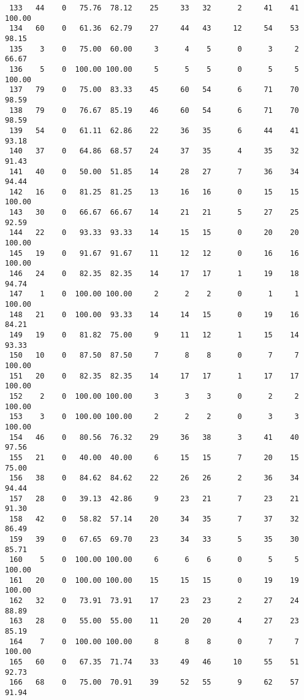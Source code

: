 \begin{verbatim}
 133   44    0   75.76  78.12    25     33   32      2     41    41   100.00
 134   60    0   61.36  62.79    27     44   43     12     54    53    98.15
 135    3    0   75.00  60.00     3      4    5      0      3     2    66.67
 136    5    0  100.00 100.00     5      5    5      0      5     5   100.00
 137   79    0   75.00  83.33    45     60   54      6     71    70    98.59
 138   79    0   76.67  85.19    46     60   54      6     71    70    98.59
 139   54    0   61.11  62.86    22     36   35      6     44    41    93.18
 140   37    0   64.86  68.57    24     37   35      4     35    32    91.43
 141   40    0   50.00  51.85    14     28   27      7     36    34    94.44
 142   16    0   81.25  81.25    13     16   16      0     15    15   100.00
 143   30    0   66.67  66.67    14     21   21      5     27    25    92.59
 144   22    0   93.33  93.33    14     15   15      0     20    20   100.00
 145   19    0   91.67  91.67    11     12   12      0     16    16   100.00
 146   24    0   82.35  82.35    14     17   17      1     19    18    94.74
 147    1    0  100.00 100.00     2      2    2      0      1     1   100.00
 148   21    0  100.00  93.33    14     14   15      0     19    16    84.21
 149   19    0   81.82  75.00     9     11   12      1     15    14    93.33
 150   10    0   87.50  87.50     7      8    8      0      7     7   100.00
 151   20    0   82.35  82.35    14     17   17      1     17    17   100.00
 152    2    0  100.00 100.00     3      3    3      0      2     2   100.00
 153    3    0  100.00 100.00     2      2    2      0      3     3   100.00
 154   46    0   80.56  76.32    29     36   38      3     41    40    97.56
 155   21    0   40.00  40.00     6     15   15      7     20    15    75.00
 156   38    0   84.62  84.62    22     26   26      2     36    34    94.44
 157   28    0   39.13  42.86     9     23   21      7     23    21    91.30
 158   42    0   58.82  57.14    20     34   35      7     37    32    86.49
 159   39    0   67.65  69.70    23     34   33      5     35    30    85.71
 160    5    0  100.00 100.00     6      6    6      0      5     5   100.00
 161   20    0  100.00 100.00    15     15   15      0     19    19   100.00
 162   32    0   73.91  73.91    17     23   23      2     27    24    88.89
 163   28    0   55.00  55.00    11     20   20      4     27    23    85.19
 164    7    0  100.00 100.00     8      8    8      0      7     7   100.00
 165   60    0   67.35  71.74    33     49   46     10     55    51    92.73
 166   68    0   75.00  70.91    39     52   55      9     62    57    91.94

\end{verbatim}
